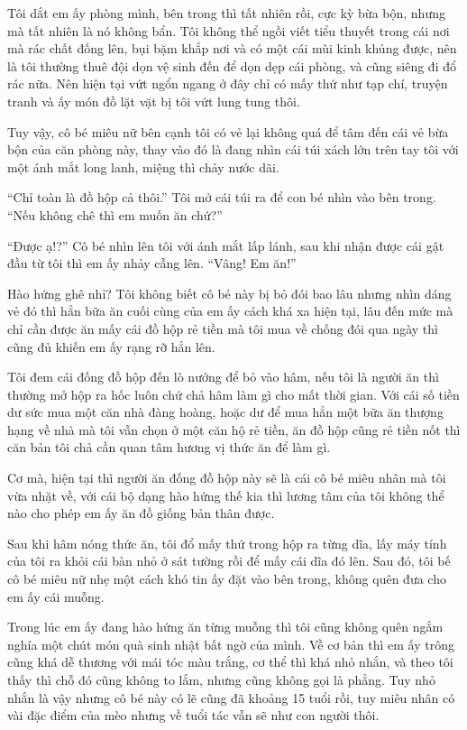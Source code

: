 {Tôi dắt em ấy phòng mình, bên trong thì tất nhiên rồi, cực kỳ bừa bộn,
nhưng mà tất nhiên là nó không bẩn. Tôi không thể ngồi viết tiểu thuyết
trong cái nơi mà rác chất đống lên, bụi bặm khắp nơi và có một cái mùi
kinh khủng được, nên là tôi thường thuê đội dọn vệ sinh đến để dọn dẹp
cái phòng, và cũng siêng đi đổ rác nữa. Nên hiện tại vứt ngổn ngang ở
đây chỉ có mấy thứ như tạp chí, truyện tranh và ấy món đồ lặt vặt bị tôi
vứt lung tung thôi.

Tuy vậy, cô bé miêu nữ bên cạnh tôi có vẻ lại không quá để tâm đến cái
vẻ bừa bộn của căn phòng này, thay vào đó là đang nhìn cái túi xách lớn
trên tay tôi với một ánh mắt long lanh, miệng thì chảy nước dãi.

``Chỉ toàn là đồ hộp cả thôi.'' Tôi mở cái túi ra để con bé nhìn vào bên
trong. ``Nếu không chê thì em muốn ăn chứ?''

``Được ạ!?'' Cô bé nhìn lên tôi với ánh mắt lấp lánh, sau khi nhận được
cái gật đầu từ tôi thì em ấy nhảy cẫng lên. ``Vâng! Em ăn!''

Hào hứng ghê nhỉ? Tôi không biết cô bé này bị bỏ đói bao lâu nhưng nhìn
dáng vẻ đó thì hẳn bữa ăn cuối cùng của em ấy cách khá xa hiện tại, lâu
đến mức mà chỉ cần được ăn mấy cái đồ hộp rẻ tiền mà tôi mua về chống
đói qua ngày thì cũng đủ khiến em ấy rạng rỡ hẳn lên.

Tôi đem cái đống đồ hộp đến lò nướng để bỏ vào hâm, nếu tôi là người ăn
thì thường mở hộp ra hốc luôn chứ chả hâm làm gì cho mất thời gian. Với
cái số tiền dư sức mua một căn nhà đàng hoàng, hoặc dư để mua hẳn một
bữa ăn thượng hạng về nhà mà tôi vẫn chọn ở một căn hộ rẻ tiền, ăn đồ
hộp cũng rẻ tiền nốt thì căn bản tôi chả cần quan tâm hương vị thức ăn
để làm gì.

Cơ mà, hiện tại thì người ăn đống đồ hộp này sẽ là cái cô bé miêu nhân
mà tôi vừa nhặt về, với cái bộ dạng hào hứng thế kia thì lương tâm của
tôi không thể nào cho phép em ấy ăn đồ giống bản thân được.

Sau khi hâm nóng thức ăn, tôi đổ mấy thứ trong hộp ra từng dĩa, lấy máy
tính của tôi ra khỏi cái bàn nhỏ ở sát tường rồi để mấy cái dĩa đó lên.
Sau đó, tôi bế cô bé miêu nữ nhẹ một cách khó tin ấy đặt vào bên trong,
không quên đưa cho em ấy cái muỗng.

Trong lúc em ấy đang hào hứng ăn từng muỗng thì tôi cũng không quên ngắm
nghía một chút món quà sinh nhật bất ngờ của mình. Về cơ bản thì em ấy
trông cũng khá dễ thương với mái tóc màu trắng, cơ thể thì khá nhỏ nhắn,
và theo tôi thấy thì chỗ đó cũng không to lắm, nhưng cũng không gọi là
phẳng. Tuy nhỏ nhắn là vậy nhưng cô bé này có lẽ cũng đã khoảng 15 tuổi
rồi, tuy miêu nhân có vài đặc điểm của mèo nhưng về tuổi tác vẫn sẽ như
con người thôi.

}
